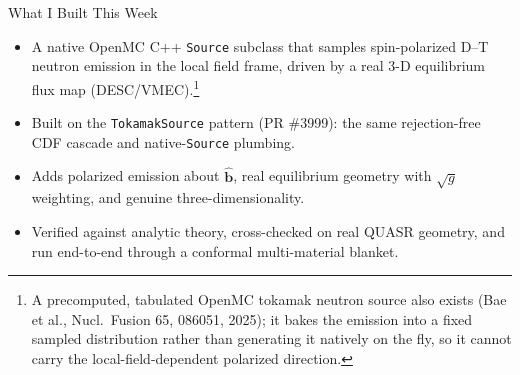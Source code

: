 \documentclass[11pt,aspectratio=169]{beamer}
\newcommand{\bhat}{\hat{\mathbf{b}}}
\begin{document}
\begin{frame}{What I Built This Week}
\begin{itemize}
\item A native OpenMC C++ \texttt{Source} subclass that samples spin-polarized D--T
      neutron emission in the local field frame, driven by a real 3-D equilibrium flux
      map (DESC/VMEC).\footnote{\scriptsize A precomputed, tabulated OpenMC tokamak
      neutron source also exists (Bae et al., Nucl.\ Fusion 65, 086051, 2025); it bakes
      the emission into a fixed sampled distribution rather than generating it natively on
      the fly, so it cannot carry the local-field-dependent polarized direction.}
\item Built on the \texttt{TokamakSource} pattern (PR \#3999): the same rejection-free CDF
      cascade and native-\texttt{Source} plumbing.
\item Adds polarized emission about $\bhat$, real equilibrium geometry with $\sqrt{g}$
      weighting, and genuine three-dimensionality.
\item Verified against analytic theory, cross-checked on real QUASR geometry, and run
      end-to-end through a conformal multi-material blanket.
\end{itemize}
\end{frame}
\end{document}
